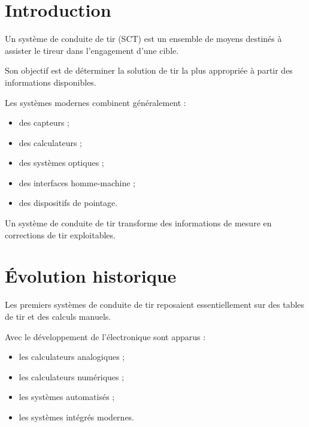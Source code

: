 
\section{Introduction}

Un système de conduite de tir (SCT) est un ensemble de moyens destinés à
assister le tireur dans l'engagement d'une cible.

Son objectif est de déterminer la solution de tir la plus appropriée à partir
des informations disponibles.

Les systèmes modernes combinent généralement :

\begin{itemize}
    \item des capteurs ;
    \item des calculateurs ;
    \item des systèmes optiques ;
    \item des interfaces homme-machine ;
    \item des dispositifs de pointage.
\end{itemize}

\begin{aretenir}

Un système de conduite de tir transforme des informations de mesure en
corrections de tir exploitables.

\end{aretenir}

\section{Évolution historique}

Les premiers systèmes de conduite de tir reposaient essentiellement sur des
tables de tir et des calculs manuels.

Avec le développement de l'électronique sont apparus :

\begin{itemize}
    \item les calculateurs analogiques ;
    \item les calculateurs numériques ;
    \item les systèmes automatisés ;
    \item les systèmes intégrés modernes.
\end{itemize}

